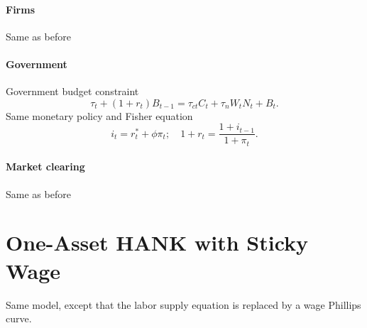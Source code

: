 \documentclass[11pt,a4paper]{article}
\begin{document}
\paragraph{Firms} Same as before


\paragraph{Government}
Government budget constraint
\begin{equation*}
\tau_t+(1+r_t)B_{t-1}=\tau_{ct}C_t+\tau_{n}W_tN_t+B_t.
\end{equation*}
Same monetary policy and Fisher equation
\begin{equation*}
i_t=r_t^*+\phi\pi_t;\quad 1+r_t=\frac{1+i_{t-1}}{1+\pi_t}.
\end{equation*}


\paragraph{Market clearing} Same as before




\section{One-Asset HANK with Sticky Wage}
Same model, except that the labor supply equation is replaced by a wage Phillips curve.
\end{document}
